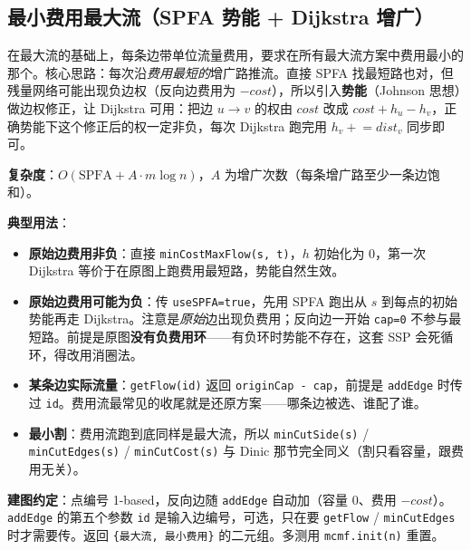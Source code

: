 \subsection{最小费用最大流（SPFA 势能 + Dijkstra 增广）}

在最大流的基础上，每条边带单位流量费用，要求在所有最大流方案中费用最小的那个。核心思路：每次沿\emph{费用最短的}增广路推流。直接 SPFA 找最短路也对，但残量网络可能出现负边权（反向边费用为 $-cost$），所以引入\textbf{势能}（Johnson 思想）做边权修正，让 Dijkstra 可用：把边 $u\to v$ 的权由 $cost$ 改成 $cost + h_u - h_v$，正确势能下这个修正后的权一定非负，每次 Dijkstra 跑完用 $h_v \mathrel{+}= dist_v$ 同步即可。

\textbf{复杂度}：$O(\text{SPFA} + A \cdot m \log n)$，$A$ 为增广次数（每条增广路至少一条边饱和）。

\textbf{典型用法}：

\begin{itemize}
	\item \textbf{原始边费用非负}：直接 \texttt{minCostMaxFlow(s, t)}，$h$ 初始化为 $0$，第一次 Dijkstra 等价于在原图上跑费用最短路，势能自然生效。
	\item \textbf{原始边费用可能为负}：传 \texttt{useSPFA=true}，先用 SPFA 跑出从 $s$ 到每点的初始势能再走 Dijkstra。注意是\emph{原始}边出现负费用；反向边一开始 \texttt{cap=0} 不参与最短路。前提是原图\textbf{没有负费用环}——有负环时势能不存在，这套 SSP 会死循环，得改用消圈法。
	\item \textbf{某条边实际流量}：\texttt{getFlow(id)} 返回 \texttt{originCap - cap}，前提是 \texttt{addEdge} 时传过 \texttt{id}。费用流最常见的收尾就是还原方案——哪条边被选、谁配了谁。
	\item \textbf{最小割}：费用流跑到底同样是最大流，所以 \texttt{minCutSide(s)} / \texttt{minCutEdges(s)} / \texttt{minCutCost(s)} 与 Dinic 那节完全同义（割只看容量，跟费用无关）。
\end{itemize}

\textbf{建图约定}：点编号 1-based，反向边随 \texttt{addEdge} 自动加（容量 $0$、费用 $-cost$）。\texttt{addEdge} 的第五个参数 \texttt{id} 是输入边编号，可选，只在要 \texttt{getFlow} / \texttt{minCutEdges} 时才需要传。返回 \texttt{\{最大流, 最小费用\}} 的二元组。多测用 \texttt{mcmf.init(n)} 重置。

